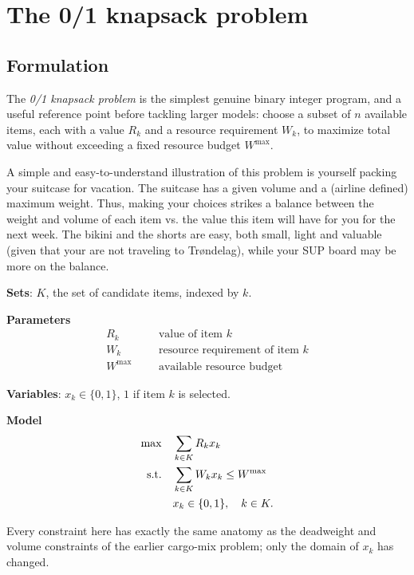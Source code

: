 \section{The 0/1 knapsack problem}
\label{sec:knapsack}

\subsection{Formulation}

The \emph{0/1 knapsack problem} is the simplest genuine binary integer
program, and a useful reference point before tackling larger models:
choose a subset of $n$ available items, each with a value $R_k$ and a
resource requirement $W_k$, to maximize total value without exceeding a
fixed resource budget $W^{\max}$.

A simple and easy-to-understand illustration of this problem is yourself packing your suitcase for vacation. The suitcase has a given volume and a (airline defined) maximum weight. Thus, making your choices strikes a balance between the weight and volume of each item vs. the value this item will have for you for the next week. The bikini and the shorts are easy, both small, light and valuable (given that your are not traveling to Tr{\o}ndelag), while your SUP board may be more on the balance.

\medskip
\noindent\textbf{Sets}: $K$, the set of candidate items, indexed by $k$.

\medskip
\noindent\textbf{Parameters}
\begin{align*}
  R_k & &&\text{value of item } k \\
  W_k & &&\text{resource requirement of item } k \\
  W^{\max} & &&\text{available resource budget}
\end{align*}

\noindent\textbf{Variables}: $x_k\in\{0,1\}$, $1$ if item $k$ is selected.

\medskip
\noindent\textbf{Model}
\begin{align}
  \max \quad & \sum_{k\in K} R_k x_k \label{eq:knapsack}\\
  \text{s.t.} \quad & \sum_{k\in K} W_k x_k \leq W^{\max} \notag\\
  & x_k \in \{0,1\}, \quad k\in K. \notag
\end{align}

Every constraint here has exactly the same anatomy as the deadweight and
volume constraints of the earlier cargo-mix problem; only the domain of
$x_k$ has changed.

